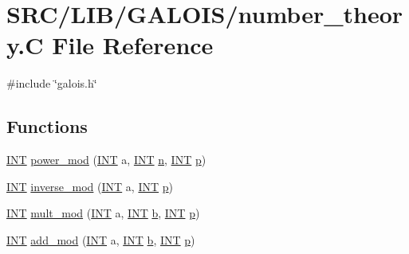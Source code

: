 \hypertarget{number__theory_8_c}{}\section{S\+R\+C/\+L\+I\+B/\+G\+A\+L\+O\+I\+S/number\+\_\+theory.C File Reference}
\label{number__theory_8_c}
{\ttfamily \#include \char`\"{}galois.\+h\char`\"{}}\newline
\subsection*{Functions}
\begin{DoxyCompactItemize}
\item 
\mbox{\hyperlink{galois_8h_a09fddde158a3a20bd2dcadb609de11dc}{I\+NT}} \mbox{\hyperlink{number__theory_8_c_a79693b942083caf7182896bf61426cab}{power\+\_\+mod}} (\mbox{\hyperlink{galois_8h_a09fddde158a3a20bd2dcadb609de11dc}{I\+NT}} a, \mbox{\hyperlink{galois_8h_a09fddde158a3a20bd2dcadb609de11dc}{I\+NT}} \mbox{\hyperlink{simeon_8_c_a7f2cd26777ce0ff3fdaf8d02aacbddfb}{n}}, \mbox{\hyperlink{galois_8h_a09fddde158a3a20bd2dcadb609de11dc}{I\+NT}} \mbox{\hyperlink{alphabet2_8_c_a533391314665d6bf1b5575e9a9cd8552}{p}})
\item 
\mbox{\hyperlink{galois_8h_a09fddde158a3a20bd2dcadb609de11dc}{I\+NT}} \mbox{\hyperlink{number__theory_8_c_acf368cfa9638bcf69f2ced357a6d2250}{inverse\+\_\+mod}} (\mbox{\hyperlink{galois_8h_a09fddde158a3a20bd2dcadb609de11dc}{I\+NT}} a, \mbox{\hyperlink{galois_8h_a09fddde158a3a20bd2dcadb609de11dc}{I\+NT}} \mbox{\hyperlink{alphabet2_8_c_a533391314665d6bf1b5575e9a9cd8552}{p}})
\item 
\mbox{\hyperlink{galois_8h_a09fddde158a3a20bd2dcadb609de11dc}{I\+NT}} \mbox{\hyperlink{number__theory_8_c_aa425afc62e74c0e96664eb9ecc4bab8e}{mult\+\_\+mod}} (\mbox{\hyperlink{galois_8h_a09fddde158a3a20bd2dcadb609de11dc}{I\+NT}} a, \mbox{\hyperlink{galois_8h_a09fddde158a3a20bd2dcadb609de11dc}{I\+NT}} \mbox{\hyperlink{alphabet2_8_c_a148e3876077787926724625411d6e7a9}{b}}, \mbox{\hyperlink{galois_8h_a09fddde158a3a20bd2dcadb609de11dc}{I\+NT}} \mbox{\hyperlink{alphabet2_8_c_a533391314665d6bf1b5575e9a9cd8552}{p}})
\item 
\mbox{\hyperlink{galois_8h_a09fddde158a3a20bd2dcadb609de11dc}{I\+NT}} \mbox{\hyperlink{number__theory_8_c_a1ca85cd5ee0eea1bde939f936a19d304}{add\+\_\+mod}} (\mbox{\hyperlink{galois_8h_a09fddde158a3a20bd2dcadb609de11dc}{I\+NT}} a, \mbox{\hyperlink{galois_8h_a09fddde158a3a20bd2dcadb609de11dc}{I\+NT}} \mbox{\hyperlink{alphabet2_8_c_a148e3876077787926724625411d6e7a9}{b}}, \mbox{\hyperlink{galois_8h_a09fddde158a3a20bd2dcadb609de11dc}{I\+NT}} \mbox{\hyperlink{alphabet2_8_c_a533391314665d6bf1b5575e9a9cd8552}{p}})

\end{DoxyCompactItemize}
